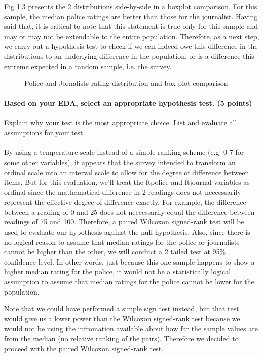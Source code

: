 \documentclass[12pt]{article}
\begin{document}
Fig 1.3 presents the 2 distributions side-by-side in a boxplot comparison. For this sample, the median police ratings are better than those for the journalist. Having said that, it is critical to note that this statement is true only for this sample and may or may not be extendable to the entire population. Therefore, as a next step, we carry out a hypothesis test to check if we can indeed owe this difference in the distributions to an underlying difference in the population, or is a difference this extreme expected in a random sample, i.e. the survey.

\begin{figure}[H]
\centering
\scalebox{.70}{
}
\caption{Police and Jornalists rating distribution and box-plot comparison}
\end{figure}

\paragraph{Based on your EDA, select an appropriate hypothesis test. (5 points)}
Explain why your test is the most appropriate choice. List and evaluate all assumptions for your test.
\paragraph{}
By using a temperature scale instead of a simple ranking scheme (e.g. 0-7 for some other variables), it appears that the survey intended to transform an ordinal scale into an interval scale to allow for the degree of difference between items. But for this evaluation, we'll treat the ftpolice and ftjournal variables as ordinal since the mathematical difference in 2 readings does not neccessarily represent the effective degree of difference exactly. For example, the difference between a reading of 0 and 25 does not neccessarily equal the difference between readings of 75 and 100. Therefore, a paired Wilcoxon signed-rank test will be used to evaluate our hypothesis against the null hypothesis. Also, since there is no logical reason to assume that median ratings for the police or journalists cannot be higher than the other, we will conduct a 2 tailed test at 95\% confidence level. In other words, just because this one sample happens to show a higher median rating for the police, it would not be a statistically logical assumption to assume that median ratings for the police cannot be lower for the population.

Note that we could have performed a simple sign test instead, but that test would give us a lower power than the Wilcoxon signed-rank test because we would not be using the infromation available about how far the sample values are from the median (no relative ranking of the pairs). Therefore we decided to proceed with the paired Wilcoxon signed-rank test.
\end{document}
